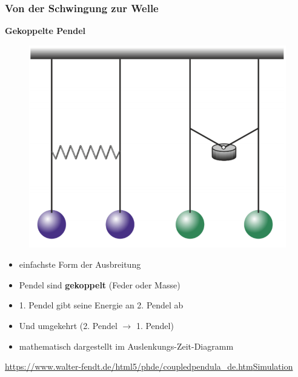 \documentclass{beamer}
\begin{document}
\frame
{
  \frametitle{Von der Schwingung zur Welle}
  \textbf{Gekoppelte Pendel}
	\begin{figure}
	\includegraphics[scale=0.2]{Pendel_gekoppelt}
	\end{figure}
	\begin{itemize}
	\item einfachste Form der Ausbreitung
	\item Pendel sind \textbf{gekoppelt} (Feder oder Masse)
	\item 1. Pendel gibt seine Energie an 2. Pendel ab
	\item Und umgekehrt (2. Pendel $\rightarrow$ 1. Pendel)
	\item mathematisch dargestellt im Auslenkungs-Zeit-Diagramm
	\end{itemize}
	\url{https://www.walter-fendt.de/html5/phde/coupledpendula_de.htm}\quad \href{file:///home/heikoneu/Dokumente/latex/FOS_12_L/videos/gekoppelte_Pendel.mp4}{Simulation}
}
\end{document}
